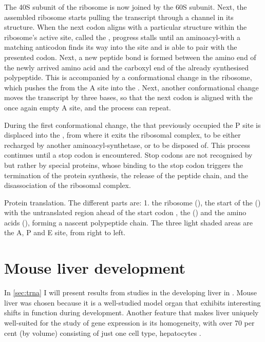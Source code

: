 The 40S subunit of the ribosome is now joined by the 60S subunit. Next, the
assembled ribosome starts pulling the \mrna transcript through a channel in its
structure. When the next codon aligns with a particular structure within the
ribosome’s active site, called the , progress stalls until an
aminoacyl-\trna with a matching anticodon finds its way into the site and is
able to pair with the presented codon. Next, a new peptide bond is formed
between the amino end of the newly arrived amino acid and the carboxyl end of
the already synthesised polypeptide. This is accompanied by a conformational
change in the ribosome, which pushes the \trna from the A site into the
. Next, another conformational change moves the \mrna transcript
by three bases, so that the next codon is aligned with the once again empty A
site, and the process can repeat.

During the first conformational change, the \trna that previously occupied the P
site is displaced into the , from where it exits the ribosomal
complex, to be either recharged by another aminoacyl-\trna synthetase, or to be
disposed of. This process continues until a stop codon is encountered. Stop
codons are not recognised by \trna[s] but rather by special proteins, whose
binding to the stop codon triggers the termination of the protein synthesis, the
release of the peptide chain, and the disassociation of the ribosomal complex.

    {Protein translation.}
    {The different parts are: 1. the ribosome (\tertiaryname{}), the start of
    the  (\primaryname{}) with the \fivep untranslated region ahead
    of the start codon , the \trna[s] (\secondaryname{}) and the
    amino acids (\quinaryname{}), forming a nascent polypeptide chain. The three
    light shaded areas are the A, P and E site, from right to left.}



\section{Mouse liver development}

In \cref{sec:trna} I will present results from studies in the developing liver
in \mmu. Mouse liver was chosen because it is a well-studied model organ that
exhibits interesting shifts in function during development. Another feature that
makes liver uniquely well-suited for the study of gene expression is its
homogeneity, with over \num{70} per cent (by volume) consisting of just one
cell type, hepatocytes \citep{Si-Tayeb:2010}.

